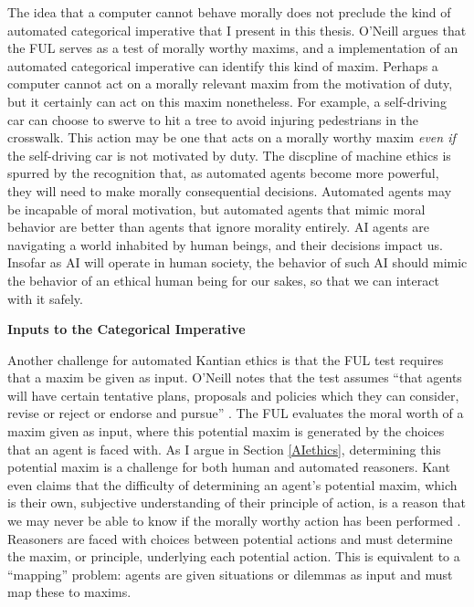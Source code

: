 \begin{isabellebody}
\begin{isamarkuptext}
The idea that a computer cannot behave morally does not preclude the kind 
of automated categorical imperative that I present in this thesis. O'Neill argues that the FUL
serves as a test of morally worthy maxims, and a implementation of an automated categorical imperative can 
identify this kind of maxim. Perhaps a computer cannot act on a morally relevant maxim from the motivation of duty, 
but it certainly can act on this maxim nonetheless. For example, a self-driving car can choose to swerve to hit a tree
to avoid injuring pedestrians in the crosswalk. This action may be one that acts on a morally worthy maxim
\emph{even if} the self-driving car is not motivated by duty. The discpline of machine ethics is
spurred by the recognition that, as automated agents become more powerful, they will need to make
morally consequential decisions. Automated agents may be incapable of moral motivation, but automated agents that mimic
moral behavior are better than agents that ignore morality entirely. AI agents are navigating a world 
inhabited by human beings, and their decisions impact us. Insofar as AI will operate in human society, 
the behavior of such AI should mimic the behavior of an ethical human being for our sakes, so that we 
can interact with it safely. 

\medskip 

\noindent \textbf{Inputs to the Categorical Imperative}

Another challenge for automated Kantian ethics is that the FUL test requires that
a maxim be given as input. O'Neill notes that the test assumes ``that agents will have certain tentative 
plans, proposals and policies which they can consider, revise or reject or endorse and pursue'' \citep[343]{oneilluniversallaws}.
The FUL evaluates the moral worth of a maxim given as input, where this potential maxim is generated by 
the choices that an agent is faced with. As I argue in Section \ref{AIethics}, determining this potential maxim is a challenge for both human
and automated reasoners. Kant even claims that the difficulty of determining an agent's potential maxim, which is their
own, subjective understanding of their principle of action, is a reason that we may never be able 
to know if the morally worthy action has been performed \cite[345]{oneilluniversallaws}. Reasoners are faced with
choices between potential actions and must determine the maxim, or principle, underlying each potential action.
This is equivalent to a ``mapping'' problem: agents are given situations or dilemmas as input and must map
these to maxims.


\end{isamarkuptext}
\end{isabellebody}
